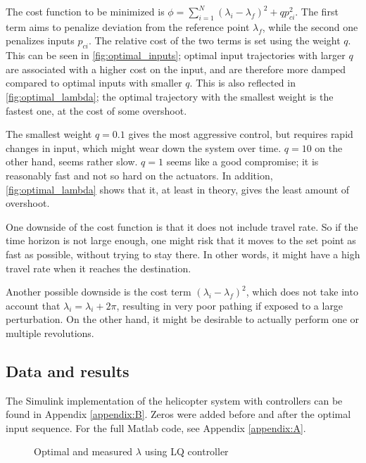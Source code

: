 The cost function to be minimized is $\phi = \sum_{i=1}^{N} (\lambda_i-\lambda_f)^2 + qp_{ci}^2$. The first term aims to penalize deviation from the reference point $\lambda_f$, while the second one penalizes inputs $p_{ci}$. The relative cost of the two terms is set using the weight $q$. This can be seen in \cref{fig:optimal_inputs}; optimal input trajectories with larger $q$ are associated with a higher cost on the input, and are therefore more damped compared to optimal inputs with smaller $q$. This is also reflected in \cref{fig:optimal_lambda}; the optimal trajectory with the smallest weight is the fastest one, at the cost of some overshoot.

The smallest weight $q=0.1$ gives the most aggressive control, but requires rapid changes in input, which might wear down the system over time. $q=10$ on the other hand, seems rather slow. $q=1$ seems like a good compromise; it is reasonably fast and not so hard on the actuators. In addition, \cref{fig:optimal_lambda} shows that it, at least in theory, gives the least amount of overshoot.

One downside of the cost function is that it does not include travel rate. So if the time horizon is not large enough, one might risk that it moves to the set point as fast as possible, without trying to stay there. In other words, it might have a high travel rate when it reaches the destination.

Another possible downside is the cost term $(\lambda_i - \lambda_f)^2$, which does not take into account that $\lambda_i = \lambda_ i + 2\pi$, resulting in very poor pathing if exposed to a large perturbation. On the other hand, it might be desirable to actually perform one or multiple revolutions.

\subsection{Data and results}
\label{subsec:p2d}
The Simulink implementation of the helicopter system with controllers can be found in Appendix \ref{appendix:B}. Zeros were added before and after the optimal input sequence. For the full Matlab code, see Appendix \ref{appendix:A}.

\begin{figure}[H]
    \centering
    \caption{Optimal and measured $\lambda$ using LQ controller}
    \label{fig:optimal_and_measured}
\end{figure}

